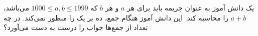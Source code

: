 \p
    یک دانش آموز به عنوان جریمه باید برای هر 
	$a$ و هر 
	$b$
	که
	$1000 \leq a , b \leq 1999$
	می‌باشد،
	$a + b$ 
	را محاسبه کند. این دانش آموز هنگام جمع، ده بر یک را منظور نمی‌کند. در چه تعداد از جمع‌ها جواب را درست به دست می‌آورد؟
